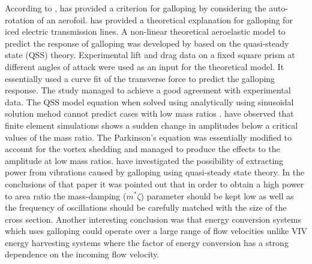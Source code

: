 According to \cite{Paidoussis2010},\cite{Glauert1919} has provided a criterion for galloping by considering the auto-rotation of an aerofoil.  \cite{DenHartog1956}  has provided a theoretical explanation for galloping for iced electric transmission lines. A non-linear theoretical aeroelastic model to predict the response of galloping was developed by \cite{Parkinson1964} based on the quasi-steady state (QSS) theory. Experimental lift and drag data on a fixed square prism at different angles of attack were used as an input for the theoretical model. It essentially used a curve fit of the transverse force to predict the galloping response. The study managed to achieve a good agreement with experimental data. The QSS model equation when solved using analytically using sinusoidal solution mehod cannot predict cases with low mass ratios  .\cite{Joly2012} have observed that finite element simulations shows a sudden change in amplitudes  below a critical values of the mass ratio. The Parkinson's equation was essentially modified to account for the vortex shedding and managed to produce the effects to the amplitude at low mass ratios.
\cite{Barrero-Gil2010a} have investigated the possibility of extracting power from vibrations caused by galloping using quasi-steady state theory. In the conclusions of that paper it was pointed out that in order to obtain a high power to area ratio
 the mass-damping ($m^*\zeta$) parameter should be kept low as well as the frequency of oscillations should be carefully matched with the size of the cross section. Another interesting conclusion was that energy conversion systems which uses galloping could operate over  a large range of flow velocities unlike VIV energy harvesting systems where the factor of energy conversion has a strong dependence on the incoming flow velocity. 